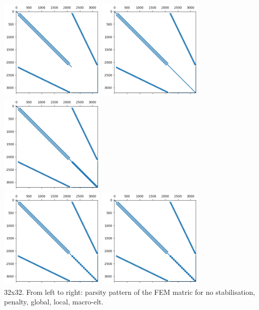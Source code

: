 \begin{center}
\includegraphics[width=5cm]{python_codes/fieldstone_115/results/dh/nostab/matrix}
\includegraphics[width=5cm]{python_codes/fieldstone_115/results/dh/penalty/matrix}
\includegraphics[width=5cm]{python_codes/fieldstone_115/results/dh/global/matrix}\\
\includegraphics[width=5cm]{python_codes/fieldstone_115/results/dh/local/matrix}
\includegraphics[width=5cm]{python_codes/fieldstone_115/results/dh/macro/matrix}\\
{\captionfont 32x32. From left to right: parsity pattern of the FEM matric for 
no stabilisation, penalty, global, local, macro-elt.}
\end{center}

